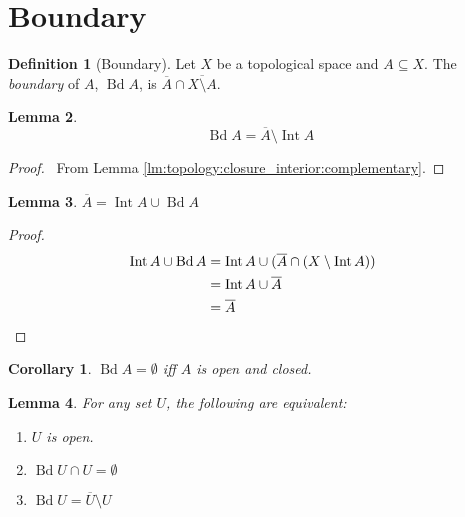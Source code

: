 \documentclass{report}
\let\qed\relax
\newtheorem{lm}{Lemma}[section]
\newtheorem{cor}{Corollary}[lm]
\theoremstyle{definition}
\newtheorem{df}[lm]{Definition}
\newcommand{\Int}{\ensuremath{\operatorname{Int}}}
\newcommand{\Bd}{\ensuremath{\operatorname{Bd}}}
\begin{document}
  \section{Boundary}

  \begin{df}[Boundary]
    Let $X$ be a topological space and $A \subseteq X$. The \emph{boundary} of
    $A$, $\Bd A$, is $\overline{A} \cap \overline{X \setminus A}$.
  \end{df}

  \begin{lm}
    \label{lm:topology:boundary:difference}
    \[ \Bd A = \overline{A} \setminus \Int A \]
  \end{lm}

  \begin{proof}
    \pf\ From Lemma \ref{lm:topology:closure_interior:complementary}. \qed
  \end{proof}

  \begin{lm}
    \label{lm:topology:boundary:interior_disjoint}
    $\overline{A} = \Int A \cup \Bd A$
  \end{lm}

  \begin{proof}
    \pf
    \begin{align*}
      \Int A \cup \Bd A & = \Int A \cup (\overline{A} \cap (X \setminus \Int
      A))
      \\
      & = \Int A \cup \overline{A} \\
      & = \overline{A} & \qed
    \end{align*}
  \end{proof}

  \begin{cor}
    $\Bd A = \emptyset$ iff $A$ is open and closed.
  \end{cor}

  \begin{lm}
    For any set $U$, the following are equivalent:
    \begin{enumerate}
      \item $U$ is open.
      \item $\Bd U \cap U = \emptyset$
      \item $\Bd U = \overline{U} \setminus U$
    \end{enumerate}
  \end{lm}
\end{document}
